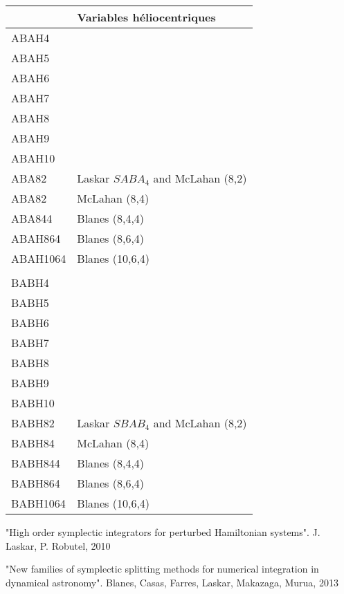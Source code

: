 \documentclass[11pt]{article}
\begin{document}
\begin{tabularx}{\textwidth}{|l|X|}
\hline
&Variables h\'eliocentriques\\
\hline
ABAH4 & \\
ABAH5 & \\
ABAH6 & \\
ABAH7 & \\
ABAH8 & \\
ABAH9 & \\
ABAH10 & \\
ABA82 & Laskar $SABA_4$ and McLahan (8,2) \\
ABA82 & McLahan (8,4) \\
ABA844 & Blanes (8,4,4) \\
ABAH864  & Blanes (8,6,4) \\
ABAH1064 & Blanes (10,6,4) \\
&\\
BABH4& \\
BABH5& \\
BABH6& \\
BABH7& \\
BABH8& \\
BABH9& \\
BABH10& \\
BABH82 &  Laskar $SBAB_4$ and McLahan (8,2) \\
BABH84 &  McLahan (8,4) \\
BABH844 & Blanes (8,4,4) \\
BABH864  & Blanes (8,6,4) \\
BABH1064 & Blanes (10,6,4) \\
\hline
\end{tabularx}

"High order symplectic integrators for perturbed Hamiltonian systems".
J. Laskar, P. Robutel, 2010


"New families of symplectic splitting methods for numerical integration in dynamical astronomy". Blanes, Casas, Farres, Laskar, Makazaga, Murua, 2013 
\end{document}
